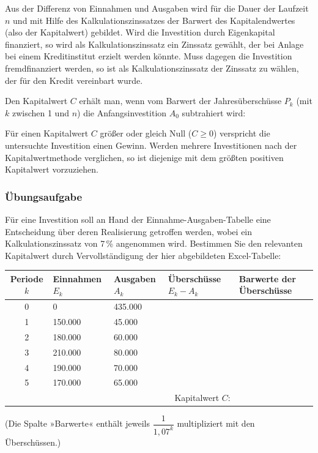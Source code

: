Aus der Differenz von Einnahmen und Ausgaben wird für die Dauer der Laufzeit $n$ und mit Hilfe des Kalkulationszinssatzes der Barwert des Kapitalendwertes (also der Kapitalwert) gebildet. Wird die Investition durch Eigenkapital finanziert, so wird als Kalkulationszinssatz ein Zinssatz gewählt, der bei Anlage bei einem Kreditinstitut erzielt werden könnte. Muss dagegen die Investition fremdfinanziert werden, so ist als Kalkulationszinssatz der Zinssatz zu wählen, der für den Kredit vereinbart wurde.

Den Kapitalwert $C$ erhält man, wenn vom Barwert der Jahresüberschüsse $P_k$ (mit $k$ zwischen 1 und $n$) die Anfangsinvestition $A_0$ subtrahiert wird:
\merkbox{\[ C = P_1 \cdot q^{-1} + P_2 \cdot q^{-2} + \ldots + P_n \cdot q^{-n} - A_0 = \sum_{k=1}^{n} P_k \cdot q^{-k} - A_0 \]}

Für einen Kapitalwert $C$ größer oder gleich Null ($C \geq 0$) verspricht die untersuchte Investition einen Gewinn. Werden mehrere Investitionen nach der Kapitalwertmethode verglichen, so ist diejenige mit dem größten positiven Kapitalwert vorzuziehen.

\subsubsection{Übungsaufgabe}

\begin{graukasten}
  Für eine Investition soll an Hand der Einnahme-Ausgaben-Tabelle eine Entscheidung über deren Realisierung getroffen werden, wobei ein Kalkulationszinssatz von 7\,\% angenommen wird. Bestimmen Sie den relevanten Kapitalwert durch Vervollständigung der hier abgebildeten Excel-Tabelle:

  \begin{center}
    \begin{tabular}{cllll}
      \hline
      Periode $k$ & Einnahmen $E_k$ & Ausgaben $A_k$ & Überschüsse $E_k - A_k$ & Barwerte der Überschüsse\\
      \hline
      0 & 0 & 435.000 & & \\
      1 & 150.000 & 45.000 & & \\
      2 & 180.000 & 60.000 & & \\
      3 & 210.000 & 80.000 & & \\
      4 & 190.000 & 70.000 & & \\
      5 & 170.000 & 65.000 & & \\
      \hline
      \multicolumn{4}{r}{Kapitalwert $C$:} & \\
    \end{tabular}
  \end{center}
  (Die Spalte »Barwerte« enthält jeweils $\dfrac{1}{1{,}07^k}$ multipliziert mit den Überschüssen.)
\end{graukasten}

